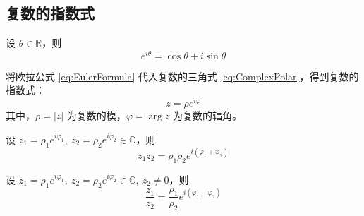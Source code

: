 \subsection{复数的指数式}

\begin{theorem}
    设 $\theta\in\mathbb{R}$，则
    \begin{equation}
        e^{i\theta} = \cos\theta + i\sin\theta
        \label{eq:EulerFormula}
    \end{equation}
\end{theorem}
\vspace{1em}

\begin{definition}[复数的指数式]
    将欧拉公式 \ref{eq:EulerFormula} 代入复数的三角式 \ref{eq:ComplexPolar}，得到复数的指数式：
    \begin{equation}
        z = \rho e^{i\varphi}
        \label{eq:ComplexExponential}
    \end{equation}
    其中，$\rho = |z|$ 为复数的模，$\varphi = \arg z$ 为复数的辐角。
\end{definition}

\begin{theorem}[复数乘法的指数式]
    设 $z_1=\rho_1 e^{i\varphi_1},\ z_2=\rho_2 e^{i\varphi_2}\in\mathbb{C}$，则
    \[
        z_1 z_2 = \rho_1 \rho_2 e^{i(\varphi_1 + \varphi_2)}
    \]
\end{theorem}


\begin{theorem}[复数除法的指数式]
    设 $z_1=\rho_1 e^{i\varphi_1},\ z_2=\rho_2 e^{i\varphi_2}\in\mathbb{C},\ z_2\neq 0$，则
    \[
        \frac{z_1}{z_2} = \frac{\rho_1}{\rho_2} e^{i(\varphi_1 - \varphi_2)}
    \]
\end{theorem}

\newpage